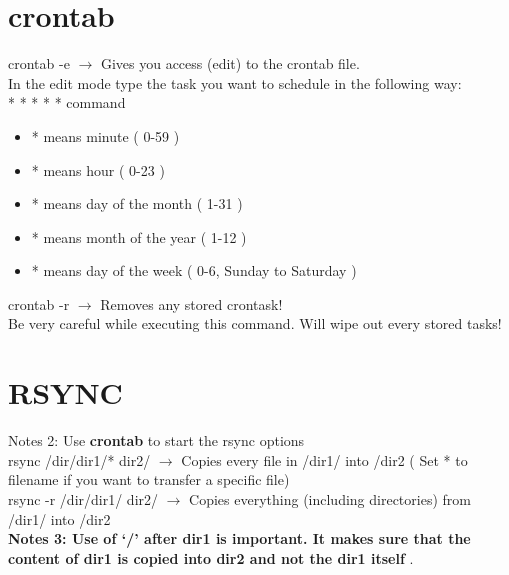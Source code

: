 \documentclass[twoside,a4paper]{article}
\newcommand{\tcb}{\color{blue}} \newcommand{\tcc}{\color{cyan}} \newcommand{\tcr}{\color{red}}
\newcommand{\tcg}{\color{gray}} \newcommand{\tco}{\color{orange}} \newcommand{\tcp}{\color{purple}}
\newcommand{\tck}{\color{black}}
\newcommand{\ra }{$\rightarrow$ }
\newcommand{\hs}{\hspace}
\begin{document}
\begin{multicols}{2}
    \tcc \section{crontab} \hs{-0.5 cm}\tcr crontab \tcb  -e \tck \ra Gives you access (edit) to the
    \tcr  crontab \tck  file.\\
    In the edit mode type the task you want to schedule in the following way:\\
    \tcr  \tcb  * \tcr  * \color{green} * \color{magenta} * \tcg  * \tck  command
    \tck
    \begin{itemize}
        \item \tcb  * \tck  means minute ( 0-59 )
        \item \tcr   * \tck  means hour ( 0-23 )
        \item \color{green} * \tck  means day of the month ( 1-31 )
        \item \color{magenta} * \tck  means month of the year ( 1-12 )
        \item \tcg  * \tck  means day of the week ( 0-6, Sunday to Saturday )
    \end{itemize}

    \hs{-0.7 cm} \tcr crontab \tcb  -r \tck \ra Removes any stored crontask! \tcg \\
    Be very careful while executing this command. Will wipe out every stored tasks!

    \tcc \section{RSYNC} \hs{-0.5cm}\tcg  Notes 2: Use \textbf{crontab} to start the rsync options\\
    \hs{-0.5 cm}\tcr rsync \tcp /dir/dir1/* \tco dir2/ \tck  \ra Copies every file in \tcp /dir1/
    into \tco  /dir2 \tck ( Set * to filename if you want to transfer a specific file)\\
    \tcr rsync -r \tcp /dir/dir1/ \tco dir2/ \tck  \ra Copies everything (including directories)
    from \tcp  /dir1/ \tck  into \tco /dir2 \tck \\
    \tcg \textbf{Notes 3: Use of \textbf{`/'} after \textbf{dir1} is important. It makes sure that
        the content of \textbf{dir1} is copied into \textbf{dir2} and not the \textbf{dir1} itself
        }.\\


\end{multicols}
\end{document}
